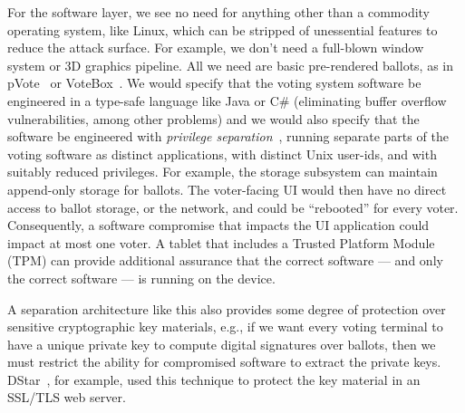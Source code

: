 For the software layer, we see no need for anything other than a commodity operating system, like Linux, which can be stripped of unessential features to reduce the attack surface. For example, we don't need a full-blown window system or 3D graphics pipeline. All we need are basic pre-rendered ballots, as in pVote~\cite{yee06prui,yee07pvote} or VoteBox~\cite{sandler08votebox}. We would specify that the voting system software be engineered in a type-safe language like Java or C\# (eliminating buffer overflow vulnerabilities, among other problems) and we would also specify that the software be engineered with {\em privilege separation}~\cite{PFH03}, running separate parts of the voting software as distinct applications, with distinct Unix user-ids, and with suitably reduced privileges. For example, the storage subsystem can maintain append-only storage for ballots. The voter-facing UI would then have no direct access to ballot storage, or the network, and could be ``rebooted'' for every voter. Consequently, a software compromise that impacts the UI application could impact at most one voter.  A tablet that includes a Trusted Platform Module (TPM) can provide additional assurance that the correct software --- and only the correct software --- is running on the device.

A separation architecture like this also provides some degree of protection over sensitive cryptographic key materials, e.g., if we want every voting terminal to have a unique private key to compute digital signatures over ballots, then we must restrict the ability for compromised software to extract the private keys. DStar~\cite{dstar2008}, for example, used this technique to protect the key material in an SSL/TLS web server.

